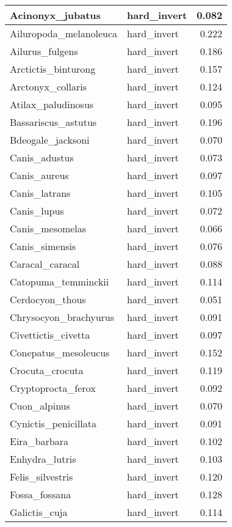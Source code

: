 \begin{table}
\begin{tabular}[t]{l|l|r}
\hline
Acinonyx\_jubatus & hard\_invert & 0.082\\
\hline
Ailuropoda\_melanoleuca & hard\_invert & 0.222\\
\hline
Ailurus\_fulgens & hard\_invert & 0.186\\
\hline
Arctictis\_binturong & hard\_invert & 0.157\\
\hline
Arctonyx\_collaris & hard\_invert & 0.124\\
\hline
Atilax\_paludinosus & hard\_invert & 0.095\\
\hline
Bassariscus\_astutus & hard\_invert & 0.196\\
\hline
Bdeogale\_jacksoni & hard\_invert & 0.070\\
\hline
Canis\_adustus & hard\_invert & 0.073\\
\hline
Canis\_aureus & hard\_invert & 0.097\\
\hline
Canis\_latrans & hard\_invert & 0.105\\
\hline
Canis\_lupus & hard\_invert & 0.072\\
\hline
Canis\_mesomelas & hard\_invert & 0.066\\
\hline
Canis\_simensis & hard\_invert & 0.076\\
\hline
Caracal\_caracal & hard\_invert & 0.088\\
\hline
Catopuma\_temminckii & hard\_invert & 0.114\\
\hline
Cerdocyon\_thous & hard\_invert & 0.051\\
\hline
Chrysocyon\_brachyurus & hard\_invert & 0.091\\
\hline
Civettictis\_civetta & hard\_invert & 0.097\\
\hline
Conepatus\_mesoleucus & hard\_invert & 0.152\\
\hline
Crocuta\_crocuta & hard\_invert & 0.119\\
\hline
Cryptoprocta\_ferox & hard\_invert & 0.092\\
\hline
Cuon\_alpinus & hard\_invert & 0.070\\
\hline
Cynictis\_penicillata & hard\_invert & 0.091\\
\hline
Eira\_barbara & hard\_invert & 0.102\\
\hline
Enhydra\_lutris & hard\_invert & 0.103\\
\hline
Felis\_silvestris & hard\_invert & 0.120\\
\hline
Fossa\_fossana & hard\_invert & 0.128\\
\hline
Galictis\_cuja & hard\_invert & 0.114\\

\end{tabular}
\end{table}
